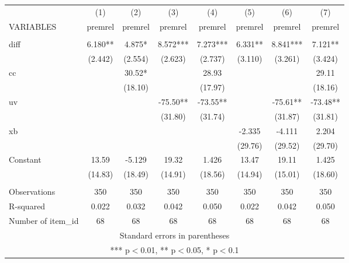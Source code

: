 \documentclass[]{article}
\begin{document}
\begin{tabular}{lccccccc} \hline
 & (1) & (2) & (3) & (4) & (5) & (6) & (7) \\
VARIABLES & premrel & premrel & premrel & premrel & premrel & premrel & premrel \\ \hline
 &  &  &  &  &  &  &  \\
diff & 6.180** & 4.875* & 8.572*** & 7.273*** & 6.331** & 8.841*** & 7.121** \\
 & (2.442) & (2.554) & (2.623) & (2.737) & (3.110) & (3.261) & (3.424) \\
cc &  & 30.52* &  & 28.93 &  &  & 29.11 \\
 &  & (18.10) &  & (17.97) &  &  & (18.16) \\
uv &  &  & -75.50** & -73.55** &  & -75.61** & -73.48** \\
 &  &  & (31.80) & (31.74) &  & (31.87) & (31.81) \\
xb &  &  &  &  & -2.335 & -4.111 & 2.204 \\
 &  &  &  &  & (29.76) & (29.52) & (29.70) \\
Constant & 13.59 & -5.129 & 19.32 & 1.426 & 13.47 & 19.11 & 1.425 \\
 & (14.83) & (18.49) & (14.91) & (18.56) & (14.94) & (15.01) & (18.60) \\
 &  &  &  &  &  &  &  \\
Observations & 350 & 350 & 350 & 350 & 350 & 350 & 350 \\
R-squared & 0.022 & 0.032 & 0.042 & 0.050 & 0.022 & 0.042 & 0.050 \\
 Number of item\_id & 68 & 68 & 68 & 68 & 68 & 68 & 68 \\ \hline
\multicolumn{8}{c}{ Standard errors in parentheses} \\
\multicolumn{8}{c}{ *** p$<$0.01, ** p$<$0.05, * p$<$0.1} \\
\end{tabular}
\end{document}
